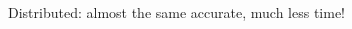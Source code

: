 \documentclass[hyperref={pdfpagelabels=false},table,10pt]{beamer}     %
\begin{document}
\begin{CJK*}{GBK}{kai}
{\begin{center}
  Distributed: almost the same accurate, much less time!
\end{center}
}


\end{CJK*}
\end{document}
